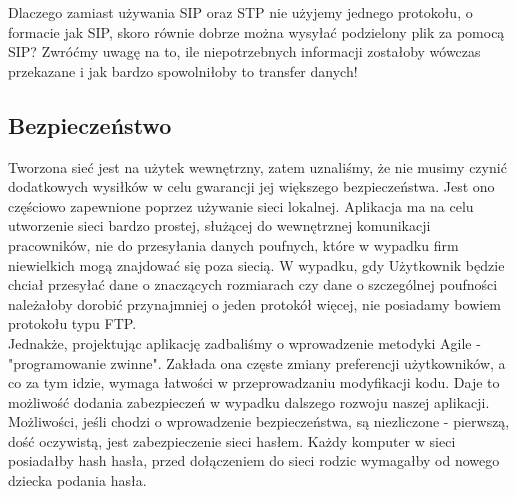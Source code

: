 Dlaczego zamiast używania SIP oraz STP nie użyjemy jednego protokołu, o formacie jak SIP, skoro równie dobrze można wysyłać podzielony plik za pomocą SIP? Zwróćmy uwagę na to, ile niepotrzebnych informacji zostałoby wówczas przekazane i jak bardzo spowolniłoby to transfer danych!

\subsection{Bezpieczeństwo}
Tworzona sieć jest na użytek wewnętrzny, zatem uznaliśmy, że nie musimy czynić dodatkowych wysiłków w celu gwarancji jej większego bezpieczeństwa. Jest ono częściowo zapewnione poprzez używanie sieci lokalnej. Aplikacja ma na celu utworzenie sieci bardzo prostej, służącej do wewnętrznej komunikacji pracowników, nie do przesyłania danych poufnych, które w wypadku firm niewielkich mogą znajdować się poza siecią. W wypadku, gdy Użytkownik będzie chciał przesyłać dane o znaczących rozmiarach czy dane o szczególnej poufności należałoby dorobić przynajmniej o jeden protokół więcej, nie posiadamy bowiem protokołu typu FTP.\\
\indent Jednakże, projektując aplikację zadbaliśmy o wprowadzenie metodyki Agile - "programowanie zwinne". Zakłada ona częste zmiany preferencji użytkowników, a co za tym idzie, wymaga łatwości w przeprowadzaniu modyfikacji kodu. Daje to możliwość dodania zabezpieczeń w wypadku dalszego rozwoju naszej aplikacji. \\
\indent Możliwości, jeśli chodzi o wprowadzenie bezpieczeństwa, są niezliczone - pierwszą, dość oczywistą, jest zabezpieczenie sieci hasłem. Każdy komputer w sieci posiadałby hash hasła, przed dołączeniem do sieci rodzic wymagałby od nowego dziecka podania hasła.

